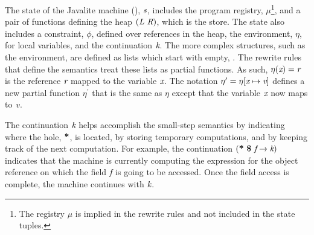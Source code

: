 The state of the Javalite machine (),
$\emph{s}$, includes the program registry, $\mu$\footnote{The registry $\mu$
  is implied in the rewrite rules and not included in the state tuples.},
  and a pair of functions defining the heap
$(\emph{L}\ \emph{R})$, which is the store. The state also
includes a constraint,
$\phi$, defined over references in the heap, the environment, $\eta$,
for local variables, and the continuation $\emph{k}$. The more
complex structures, such as the environment, are defined as lists which
start with empty, . The rewrite rules that define the
semantics treat these lists as partial functions. As such,
$\eta(\emph{x}) = \emph{r}$ is the reference $\emph{r}$ mapped to the variable
$\emph{x}$. The notation $\eta^\prime = \eta[\emph{x} \mapsto
  \emph{v}]$ defines a new partial function $\eta^\prime$ that is
the same as $\eta$ except that the variable $\emph{x}$ now maps to
$\emph{v}$.

The continuation $\emph{k}$ helps accomplish the small-step semantics
by indicating where the hole, $\textbf{*}$, is located, by storing
temporary computations, and by keeping track of the next
computation. For example, the continuation
$\lp\cfgt{*}\ \cfgt{\$}\ \cfgnt{f} \rightarrow \cfgnt{k}\rp$ indicates
that the machine is currently computing the expression for the object
reference on which the field $\emph{f}$ is going to be accessed. Once
the field access is complete, the machine continues with $\emph{k}$.




